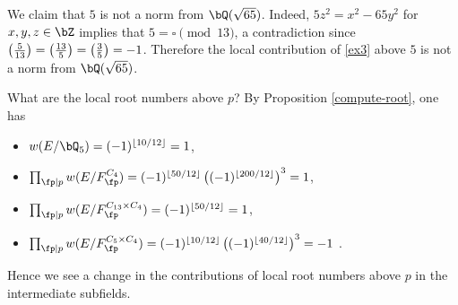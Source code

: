 \begin{example}
We claim that $5$ is not a norm from $\bQ(\sqrt{65})$. Indeed, $5z^2 = x^2 - 65 y^2$ for $x, y, z \in \bZ$ implies that $5 = \square \pmod 13$, a contradiction since $\left( \frac{5}{13} \right)  = \left( \frac{13}{5} \right)  = \left( \frac{3}{5} \right)  = -1$. Therefore the local contribution of \eqref{ex3} above $5$ is not a norm from $\bQ(\sqrt{65})$. 

What are the local root numbers above $p$? By Proposition \ref{compute-root}, one has
\begin{itemize}[--]
    \setlength\itemsep{0em}
    \item $w(E / \bQ_5) = (-1)^{\floor{ 10 / 12}} = 1$, 
    \item $\prod_{\fp \mid p} w(E /F^{C_4}_{\fp}) = (-1)^{\floor{50 / 12}} \left((-1)^{\floor{200 / 12}}\right)^3 = 1$,
    \item $\prod_{\fp \mid p} w(E /F^{C_{13} \times C_4}_{\fp}) = (-1)^{\floor{50 / 12}} = 1$,
    \item $\prod_{\fp \mid p}w(E /F^{C_{5} \times C_4}_{\fp}) = (-1)^{\floor{ 10/12}}\left((-1)^{\floor{40 / 12}}\right)^3 = -1$ .
\end{itemize}
Hence we see a change in the contributions of local root numbers above $p$ in the intermediate subfields. 




\end{example}